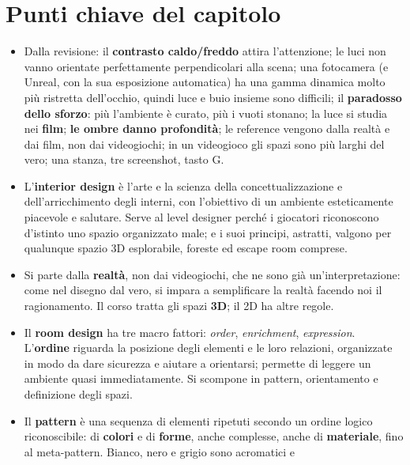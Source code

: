 \section*{Punti chiave del capitolo}

\begin{itemize}
  \item Dalla revisione: il \textbf{contrasto caldo/freddo} attira l'attenzione; le luci
        non vanno orientate perfettamente perpendicolari alla scena; una fotocamera (e
        Unreal, con la sua esposizione automatica) ha una gamma dinamica molto più
        ristretta dell'occhio, quindi luce e buio insieme sono difficili; il
        \textbf{paradosso dello sforzo}: più l'ambiente è curato, più i vuoti stonano;
        la luce si studia nei \textbf{film}; \textbf{le ombre danno profondità}; le
        reference vengono dalla realtà e dai film, non dai videogiochi; in un videogioco
        gli spazi sono più larghi del vero; una stanza, tre screenshot, tasto G.
  \item L'\textbf{interior design} è l'arte e la scienza della concettualizzazione e
        dell'arricchimento degli interni, con l'obiettivo di un ambiente esteticamente
        piacevole e salutare. Serve al level designer perché i giocatori riconoscono
        d'istinto uno spazio organizzato male; e i suoi principi, astratti, valgono per
        qualunque spazio 3D esplorabile, foreste ed escape room comprese.
  \item Si parte dalla \textbf{realtà}, non dai videogiochi, che ne sono già
        un'interpretazione: come nel disegno dal vero, si impara a semplificare la realtà
        facendo noi il ragionamento. Il corso tratta gli spazi \textbf{3D}; il 2D ha altre
        regole.
  \item Il \textbf{room design} ha tre macro fattori: \emph{order}, \emph{enrichment},
        \emph{expression}. L'\textbf{ordine} riguarda la posizione degli elementi e le
        loro relazioni, organizzate in modo da dare sicurezza e aiutare a orientarsi;
        permette di leggere un ambiente quasi immediatamente. Si scompone in pattern,
        orientamento e definizione degli spazi.
  \item Il \textbf{pattern} è una sequenza di elementi ripetuti secondo un ordine logico
        riconoscibile: di \textbf{colori} e di \textbf{forme}, anche complesse, anche di
        \textbf{materiale}, fino al meta-pattern. Bianco, nero e grigio sono acromatici e

\end{itemize}
